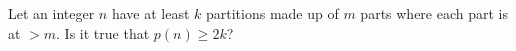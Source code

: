 Let an integer $n$ have at least $k$ partitions
made up of $m$ parts where each part is at $> m$.
Is it true that $p(n) \geq 2k$?
